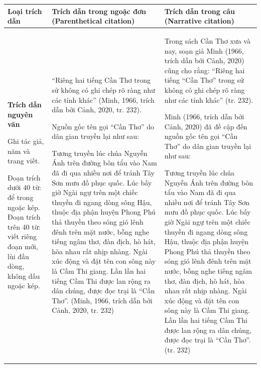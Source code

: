 \documentclass[a4paper,oneside]{../../styles/thesis}
\begin{document}
 \begin{table}
\centering
\begin{tabular}{|l|l|l|}
    \hline
      Loại trích dẫn   & Trích dẫn trong ngoặc đơn (Parenthetical citation) & Trích dẫn trong câu 
(Narrative citation)
\\
     \hline       
     \textbf{Trích dẫn nguyên văn}
     
Ghi tác giả, năm và trang viết.



Đoạn trích dưới 40 từ: để trong ngoặc kép.
Đoạn trích trên 40 từ: viết riêng đoạn mới, lùi đầu dòng, không dấu ngoặc kép.
    & ``Riêng hai tiếng Cần Thơ trong sử không có ghi chép rõ ràng như các tỉnh khác'' (Minh, 1966, trích dẫn bởi Cảnh, 2020, tr. 232). 


Nguồn gốc tên gọi ``Cần Thơ'' do dân gian truyền lại như sau:

Tương truyền lúc chúa Nguyễn Ánh trên đường bôn tẩu vào Nam đã đi qua nhiều nơi để tránh Tây Sơn mưu đồ phục quốc. Lúc bấy giờ Ngài ngự trên một chiếc thuyền đi ngang dòng sông Hậu, thuộc địa phận huyện Phong Phú thả thuyền theo sóng gió lênh đênh trên mặt nước, bỗng nghe tiếng ngâm thơ, đàn địch, hò hát, hòa nhau rất nhịp nhàng. Ngài xúc động và đặt tên con sông này là Cầm Thi giang. Lần lần hai tiếng Cầm Thi được lan rộng ra dân chúng, được đọc trại là “Cần Thơ”. (Minh, 1966, trích dẫn bởi Cảnh, 2020, tr. 232)
 & Trong sách Cần Thơ xưa và nay, soạn giả Minh (1966, trích dẫn bởi Cảnh, 2020) cũng cho rằng: “Riêng hai tiếng “Cần Thơ” trong sử không có ghi chép rõ ràng như các tỉnh khác” (tr. 232). 

Minh (1966, trích dẫn bởi Cảnh, 2020) đã đề cập đến nguồn gốc tên gọi “Cần Thơ” do dân gian truyền lại như sau:

Tương truyền lúc chúa Nguyễn Ánh trên đường bôn tẩu vào Nam đã đi qua nhiều nơi để tránh Tây Sơn mưu đồ phục quốc. Lúc bấy giờ Ngài ngự trên một chiếc thuyền đi ngang dòng sông Hậu, thuộc địa phận huyện Phong Phú thả thuyền theo sóng gió lênh đênh trên mặt nước, bỗng nghe tiếng ngâm thơ, đàn địch, hò hát, hòa nhau rất nhịp nhàng. Ngài xúc động và đặt tên con sông này là Cầm Thi giang. Lần lần hai tiếng Cầm Thi được lan rộng ra dân chúng, được đọc trại là ``Cần Thơ''. (tr. 232)
\\
         \hline
    \end{tabular}
\end{table}
\end{document}
